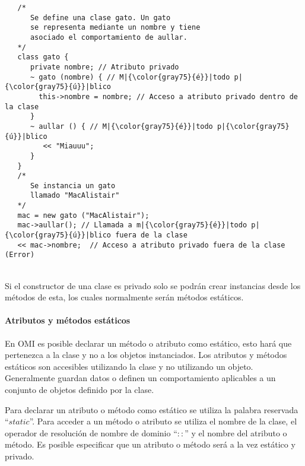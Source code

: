 \begin{lstlisting}
   /*
      Se define una clase gato. Un gato 
      se representa mediante un nombre y tiene
      asociado el comportamiento de aullar.
   */
   class gato {
      private nombre; // Atributo privado
      ~ gato (nombre) { // M|{\color{gray75}{é}}|todo p|{\color{gray75}{ú}}|blico
        this->nombre = nombre; // Acceso a atributo privado dentro de la clase
      }
      ~ aullar () { // M|{\color{gray75}{é}}|todo p|{\color{gray75}{ú}}|blico
         << "Miauuu";
      }
   }
   /*
      Se instancia un gato 
      llamado "MacAlistair"
   */
   mac = new gato ("MacAlistair"); 
   mac->aullar(); // Llamada a m|{\color{gray75}{é}}|todo p|{\color{gray75}{ú}}|blico fuera de la clase
   << mac->nombre;  // Acceso a atributo privado fuera de la clase (Error)
\end{lstlisting}
\hfill\\ 

Si el constructor de una clase es privado solo se podrán crear instancias desde los métodos de esta, los cuales normalmente serán métodos estáticos. 

\paragraph{Atributos y métodos estáticos}

En OMI es posible declarar un método o atributo como estático, esto hará que pertenezca a la clase y no a los objetos instanciados. 
Los atributos y métodos estáticos son accesibles utilizando la clase y no utilizando un objeto. Generalmente guardan datos o definen un 
comportamiento aplicables a un conjunto de objetos definido por la clase. 

Para declarar un atributo o método como estático se utiliza la palabra reservada ``$static$''. Para acceder a un método o atributo se utiliza el
nombre de la clase, el operador de resolución de nombre de dominio ``$::$'' y el nombre del atributo o método. Es posible especificar que 
un atributo o método será a la vez estático y privado. \\

